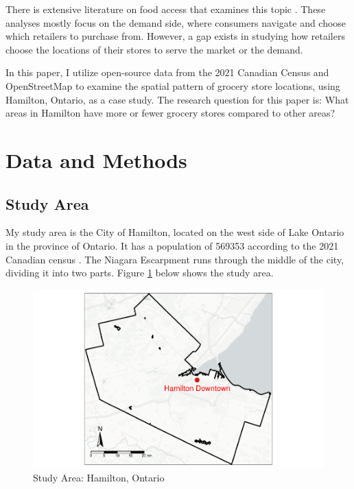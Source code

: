 \documentclass[preprint, 3p,
authoryear]{elsarticle} %
\begin{document}
There is extensive literature on food access that examines this topic
\citep{christian2012using, widener2015spatiotemporal, farber2014temporal, widener2017changes}.
These analyses mostly focus on the demand side, where consumers navigate
and choose which retailers to purchase from. However, a gap exists in
studying how retailers choose the locations of their stores to serve the
market or the demand.

In this paper, I utilize open-source data from the 2021 Canadian Census
\citep{census} and OpenStreetMap \citep{osm} to examine the spatial
pattern of grocery store locations, using Hamilton, Ontario, as a case
study. The research question for this paper is: What areas in Hamilton
have more or fewer grocery stores compared to other areas?

\section{Data and Methods}\label{data-and-methods}

\subsection{Study Area}\label{study-area}

My study area is the City of Hamilton, located on the west side of Lake
Ontario in the province of Ontario. It has a population of 569353
according to the 2021 Canadian census \citep{census}. The Niagara
Escarpment runs through the middle of the city, dividing it into two
parts. Figure \ref{fig:study_area} below shows the study area.

\begin{figure}
\centering
\includegraphics{grocery_store_hamilton_files/figure-latex/unnamed-chunk-5-1.pdf}
\caption{\label{fig:study_area}Study Area: Hamilton, Ontario}
\end{figure}
\end{document}
